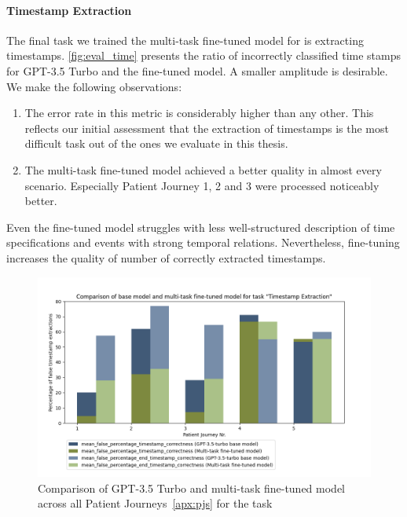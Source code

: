 \paragraph{Timestamp Extraction}
The final task we trained the multi-task fine-tuned model for is extracting timestamps. \autoref{fig:eval_time} presents the ratio of incorrectly classified time stamps for GPT-3.5 Turbo and the fine-tuned model. A smaller amplitude is desirable. We make the following observations:
\begin{enumerate}
    \item The error rate in this metric is considerably higher than any other. This reflects our initial assessment that the extraction of timestamps is the most difficult task out of the ones we evaluate in this thesis.
    \item The multi-task fine-tuned model achieved a better quality in almost every scenario. Especially Patient Journey 1, 2 and 3 were processed noticeably better.
\end{enumerate}
Even the fine-tuned model struggles with less well-structured description of time specifications and events with strong temporal relations. Nevertheless, fine-tuning increases the quality of number of correctly extracted timestamps.
\begin{figure}[ht]
    \centering
    \captionsetup{belowskip=0pt,aboveskip=0pt}
    \includegraphics[width=\textwidth]{bachelor_thesis/images/timestamp_all_sorted.png}
    \caption{Comparison of GPT-3.5 Turbo and multi-task fine-tuned model across all Patient Journeys~\ref{apx:pjs} for the task }
    \label{fig:eval_time}
\end{figure}


